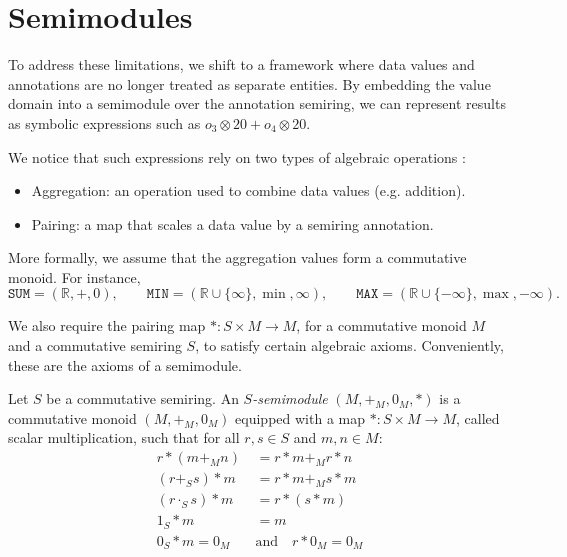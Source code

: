 \documentclass[oneside, 11pt]{amsbook}
\theoremstyle{plain}
\theoremstyle{definition}
\theoremstyle{remark}
\begin{document}
\section{Semimodules}

To address these limitations, we shift to a framework where data values and annotations are no longer treated as separate entities. By embedding the value domain into a semimodule over the annotation semiring, we can represent results as symbolic expressions such as $o_3 \otimes 20 + o_4 \otimes 20$.

We notice that such expressions rely on two types of algebraic operations \cite{Glavic2021}:
\begin{itemize}
    \item Aggregation: an operation used to combine data values (e.g. addition).
    \item Pairing: a map that scales a data value by a semiring annotation.
\end{itemize}

More formally, we assume that the aggregation values form a commutative monoid. For instance,
\[
    \texttt{SUM} = (\mathbb{R}, +, 0), \qquad
    \texttt{MIN} = (\mathbb{R} \cup \{\infty\}, \min, \infty), \qquad
    \texttt{MAX} = (\mathbb{R} \cup \{-\infty\}, \max, -\infty).
\]

We also require the pairing map $\ast : S \times M \to M$, for a commutative monoid $M$ and a commutative semiring $S$, to satisfy certain algebraic axioms. Conveniently, these are the axioms of a semimodule.

\begin{defn}[Semimodule]
    Let $S$ be a commutative semiring. An \emph{$S$-semimodule} $(M, +_M, 0_M, \ast)$ is a commutative monoid $(M, +_M, 0_M)$ equipped with a map $\ast : S \times M \to M$, called scalar multiplication, such that for all $r, s \in S$ and $m, n \in M$:
    \[
        \begin{aligned}
            r \ast (m +_M n)       & = r \ast m +_M r \ast n           \\
            (r +_S s) \ast m       & = r \ast m +_M s \ast m           \\
            (r \cdot_S s) \ast m   & = r \ast (s \ast m)               \\
            1_S \ast m             & = m                               \\
            0_S \ast m = 0_M \quad & \text{and} \quad r \ast 0_M = 0_M
        \end{aligned}
    \]
\end{defn}
\end{document}
